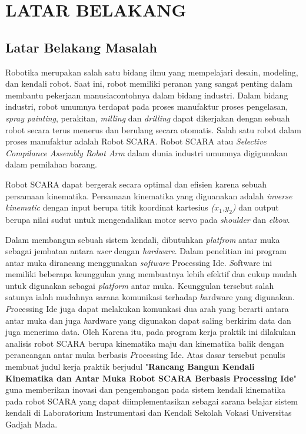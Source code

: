 
\chapter{LATAR BELAKANG}

\section{Latar Belakang Masalah}
	Robotika merupakan salah satu bidang ilmu yang mempelajari desain, modeling, dan kendali robot. Saat ini, robot memiliki peranan yang sangat penting dalam membantu pekerjaan manusiacontohnya dalam bidang industri. Dalam bidang industri, robot umumnya terdapat pada proses manufaktur proses pengelasan, \textit{spray painting}, perakitan, \textit{milling} dan \textit{drilling} dapat dikerjakan dengan sebuah robot secara terus menerus dan berulang secara otomatis. Salah satu robot dalam proses manufaktur adalah Robot SCARA. Robot SCARA atau \emph{Selective Compilance Assembly Robot Arm} dalam dunia industri umumnya digigunakan dalam pemilahan barang.
	
Robot SCARA dapat bergerak secara optimal dan efisien karena sebuah persamaan kinematika. Persamaan kinematika yang diguanakan adalah \textit{inverse kinematic} dengan input berupa titik koordinat kartesius \textit{($x_{1}$,$y_{2}$)} dan output berupa nilai sudut untuk mengendalikan motor servo pada \textit{shoulder} dan \textit{elbow}.

Dalam membangun sebuah sistem kendali, dibutuhkan \textit{platfrom} antar muka sebagai jembatan antara \textit{user} dengan \textit{hardware}. Dalam penelitian ini program antar muka dirancang menggunakan \textit{software} Processing Ide. \emph Software ini memiliki beberapa keunggulan yang membuatnya lebih efektif dan cukup mudah untuk digunakan sebagai \textit{platform} antar muka. Keunggulan tersebut salah satunya ialah mudahnya sarana komunikasi terhadap \emph hardware yang digunakan. \emph Processing Ide juga dapat melakukan komunkasi dua arah yang berarti antara antar muka dan juga \emph hardware yang digunakan dapat saling berkirim data dan juga menerima data.
Oleh Karena itu, pada program kerja praktik ini dilakukan analisis robot SCARA berupa kinematika maju dan kinematika balik dengan perancangan antar muka berbasis \emph Processing Ide. Atas dasar tersebut penulis membuat judul kerja praktik berjudul "\textbf{Rancang Bangun Kendali Kinematika dan Antar Muka Robot SCARA Berbasis Processing Ide}" guna memberikan inovasi dan pengembangan pada sistem kendali kinematika pada robot SCARA yang dapat diimplementasikan sebagai sarana belajar sistem kendali di Laboratorium Instrumentasi dan Kendali Sekolah Vokasi Universitas Gadjah Mada.\\


